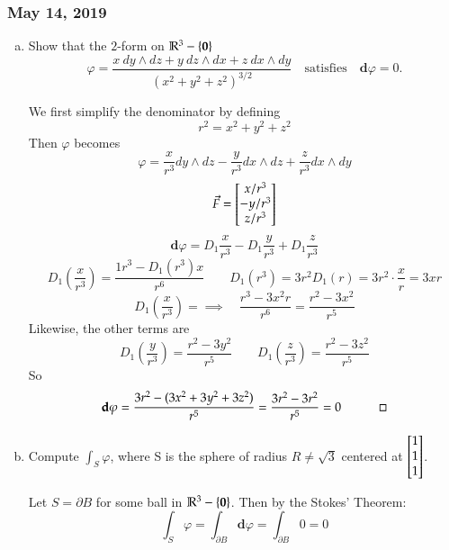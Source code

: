 \subsubsection*{May 14, 2019}

 \begin{enumerate}[a.]
	\item Show that the $2$-form on $\mathbb{R}^3 - \{\textbf{0}\}$
	\[\varphi=\frac{x\ dy\wedge dz + y\ dz\wedge dx + z\ dx\wedge dy}{(x^2+y^2+z^2)^{3/2}}\quad \text{satisfies}\quad \bm{d}\varphi=0. \]
	
	We first simplify the denominator by defining
	\[r^2=x^2+y^2+z^2\]
	Then $\varphi$ becomes
	\[\varphi = \frac{x}{r^3}dy\wedge dz - \frac{y}{r^3}dx\wedge dz + \frac{z}{r^3}dx\wedge dy\]
	\[\vec{F}=\begin{bmatrix} x/r^3 \\ -y/r^3 \\ z/r^3 \end{bmatrix}\]
	\[\bm{d}\varphi = D_1\frac{x}{r^3} - D_1\frac{y}{r^3} + D_1\frac{z}{r^3}\]
	\[D_1\left(\frac{x}{r^3}\right)=\frac{1r^3-D_1(r^3)x}{r^6}\qquad D_1(r^3)=3r^2D_1(r)=3r^2\cdot \frac{x}{r}=3xr\]
	\[D_1\left(\frac{x}{r^3}\right)=\implies \quad \frac{r^3-3x^2r}{r^6}=\frac{r^2-3x^2}{r^5}\]
	Likewise, the other terms are
	\[D_1\left(\frac{y}{r^3}\right)=\frac{r^2-3y^2}{r^5}\qquad D_1\left(\frac{z}{r^3}\right)=\frac{r^2-3z^2}{r^5}\]
	So
	\[\textbf{d}\varphi = \frac{3r^2-(3x^2+3y^2+3z^2)}{r^5}=\frac{3r^2-3r^2}{r^5}=0 \quad \qed\]

	\item Compute $\int_S \varphi$, where S is the sphere of radius $R \neq \sqrt{3}$ centered at $\begin{bmatrix} 1 \\ 1 \\ 1 \end{bmatrix}$. 
	
	Let $S=\partial B$ for some ball in $\mathbb{R}^3-\{\textbf{0}\}$. Then by the Stokes' Theorem: 
	\[\int_S \varphi = \int_{\partial B} \bm{d}\varphi = \int_{\partial B} 0 = 0\]
	
\end{enumerate}
